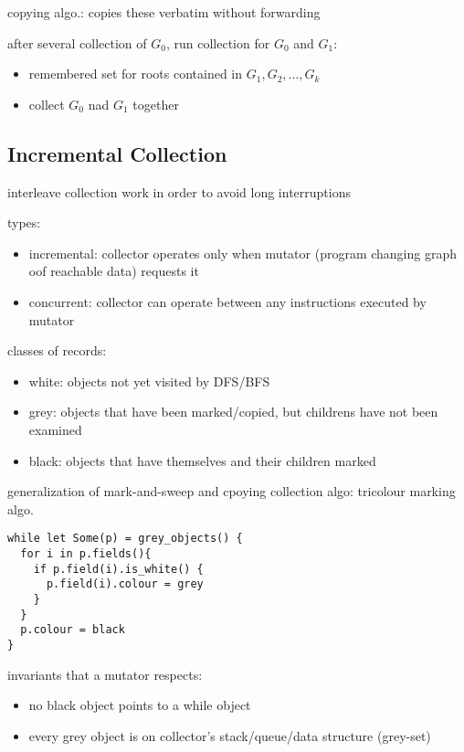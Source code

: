 \documentclass[8pt]{extarticle}
\begin{document}
\begin{multicols*}{2}
  copying algo.: copies these verbatim without forwarding

  after several collection of $G_0$, run collection for $G_0$ and $G_1$:
  \begin{itemize}
  \item remembered set for roots contained in $G_1, G_2, ..., G_k$
  \item collect $G_0$ nad $G_1$ together
  \end{itemize}

  \subsection{Incremental Collection}
  
  interleave collection work in order to avoid long interruptions

  types:
  \begin{itemize}
  \item incremental: collector operates only when mutator (program changing graph oof reachable data) requests it
  \item concurrent: collector can operate between any instructions executed by mutator
  \end{itemize}

  classes of records:
  \begin{itemize}
  \item white: objects not yet visited by DFS/BFS
  \item grey: objects that have been marked/copied, but childrens have not been examined
  \item black: objects that have themselves and their children marked
  \end{itemize}

  generalization of mark-and-sweep and cpoying collection algo: tricolour marking algo.

\begin{verbatim}
while let Some(p) = grey_objects() {
  for i in p.fields(){
    if p.field(i).is_white() {
      p.field(i).colour = grey
    }
  }
  p.colour = black
}
\end{verbatim}

  invariants that a mutator respects:
  \begin{itemize}
  \item no black object points to a while object
  \item every grey object is on collector's stack/queue/data structure (grey-set)
  \end{itemize}


\end{multicols*}
\end{document}
